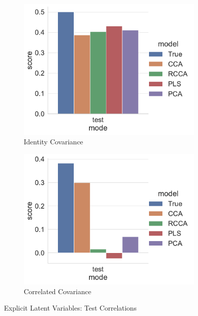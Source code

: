 \begin{figure}
    \centering
    \begin{subfigure}{0.49\linewidth}
        \centering
        \includegraphics[width=\linewidth]{figures/simulated/Train_Test_Scores_Identity_Covariance_explicit.pdf}
        \caption{Identity Covariance}
    \end{subfigure}
%
    \begin{subfigure}{0.49\linewidth}
        \centering
        \includegraphics[width=\linewidth]{figures/simulated/Train_Test_Scores_Correlated_Covariance_explicit.pdf}
        \caption{Correlated Covariance}
    \end{subfigure}
    \caption{Explicit Latent Variables: Test Correlations}
\end{figure}

